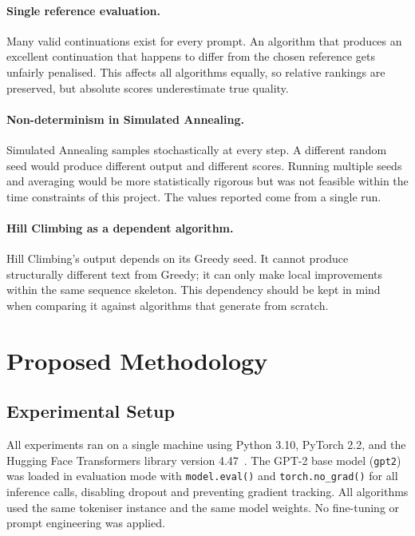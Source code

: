 \documentclass[12pt]{article}
\begin{document}
	\paragraph{Single reference evaluation.}
	Many valid continuations exist for every prompt. An algorithm that produces an excellent continuation that happens to differ from the chosen reference gets unfairly penalised. This affects all algorithms equally, so relative rankings are preserved, but absolute scores underestimate true quality.
	
	\paragraph{Non-determinism in Simulated Annealing.}
	Simulated Annealing samples stochastically at every step. A different random seed would produce different output and different scores. Running multiple seeds and averaging would be more statistically rigorous but was not feasible within the time constraints of this project. The values reported come from a single run.
	
	\paragraph{Hill Climbing as a dependent algorithm.}
	Hill Climbing's output depends on its Greedy seed. It cannot produce structurally different text from Greedy; it can only make local improvements within the same sequence skeleton. This dependency should be kept in mind when comparing it against algorithms that generate from scratch.
	
	\section{Proposed Methodology}
	\label{sec:method}
	
	\subsection{Experimental Setup}
	
	All experiments ran on a single machine using Python 3.10, PyTorch 2.2, and the Hugging Face Transformers library version 4.47~\cite{wolf2020transformers}. The GPT-2 base model (\texttt{gpt2}) was loaded in evaluation mode with \texttt{model.eval()} and \texttt{torch.no\_grad()} for all inference calls, disabling dropout and preventing gradient tracking. All algorithms used the same tokeniser instance and the same model weights. No fine-tuning or prompt engineering was applied.
	
\end{document}

